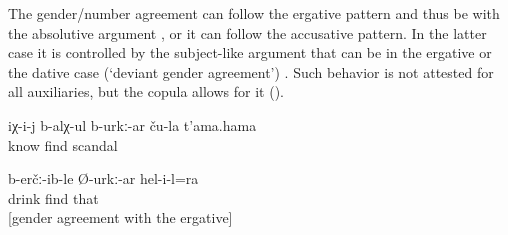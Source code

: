 The gender/number agreement can follow the ergative pattern and thus be with the absolutive argument , or it can follow the accusative pattern. In the latter case it is controlled by the subject-like argument that can be in the ergative or the dative case (`deviant gender agreement') . Such behavior is not attested for all auxiliaries, but the copula allows for it ().
%
\begin{exe}
	\ex	\label{ex:He probably knows their scandal@19}
	\gll	iχ-i-j	b-alχ-ul	b-urkː-ar	ču-la	t'ama.hama\\
			know	find		scandal\\
	\glt	{}

	\ex	\label{ex:He also drank probably agreement with ergative@18}
	\gll	b-erčː-ib-le	Ø-urkː-ar	hel-i-l=ra\\
		drink	find		that\\
	\glt	{} [gender agreement with the ergative]
\end{exe}

